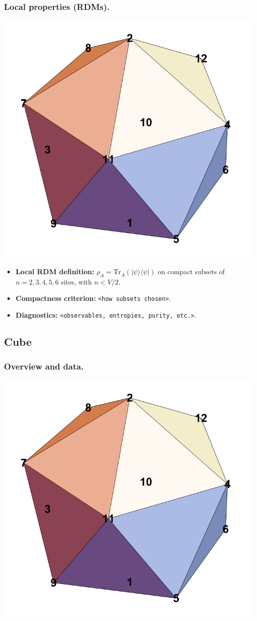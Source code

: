 \documentclass[11pt,a4paper]{article}
\begin{document}
\subsubsection*{Local properties (RDMs).}
\begin{center}
  \includegraphics[width=.6\linewidth]{icosahedron}
\end{center}

\begin{itemize}[leftmargin=1.5em]
  \item \textbf{Local RDM definition:} $\rho_A=\mathrm{Tr}_{\bar A}(|\psi\rangle\langle\psi|)$ on compact subsets of $n=2,3,4,5,6$ sites, with $n < V/2$.
  \item \textbf{Compactness criterion:} \texttt{<how subsets chosen>}.
  \item \textbf{Diagnostics:} \texttt{<observables, entropies, purity, etc.>}.
\end{itemize}


\subsection*{Cube}

\subsubsection*{Overview and data.}
\begin{center}
  \includegraphics[width=.6\linewidth]{icosahedron}
\end{center}
\end{document}

